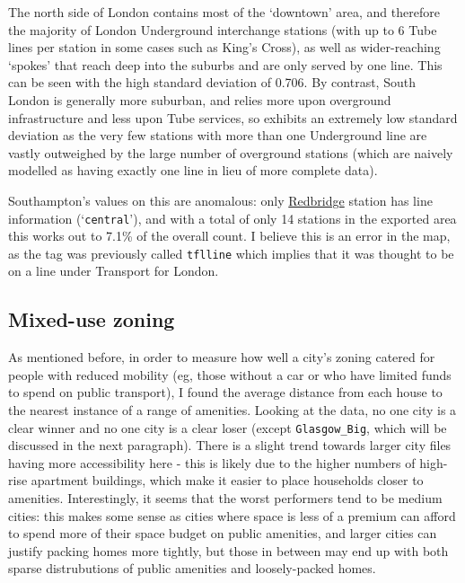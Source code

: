 \documentclass[12pt]{article} %
\begin{document}
The north side of London contains most of the `downtown' area, and therefore the majority of London Underground interchange stations (with up to 6 Tube lines per station in some cases such as King's Cross), as well as wider-reaching `spokes' that reach deep into the suburbs and are only served by one line. This can be seen with the high standard deviation of 0.706. By contrast, South London is generally more suburban, and relies more upon overground infrastructure and less upon Tube services, so exhibits an extremely low standard deviation as the very few stations with more than one Underground line are vastly outweighed by the large number of overground stations (which are naively modelled as having exactly one line in lieu of more complete data).

Southampton's values on this are anomalous: only \href{https://www.openstreetmap.org/node/7170492253}{Redbridge} station has line information (`\texttt{central}'), and with a total of only 14 stations in the exported area this works out to 7.1\% of the overall count. I believe this is an error in the map, as the tag was previously called \texttt{tflline} which implies that it was thought to be on a line under Transport for London.

\subsection{Mixed-use zoning}
As mentioned before, in order to measure how well a city's zoning catered for people with reduced mobility (eg, those without a car or who have limited funds to spend on public transport), I found the average distance from each house to the nearest instance of a range of amenities. Looking at the data, no one city is a clear winner and no one city is a clear loser (except \texttt{Glasgow\_Big}, which will be discussed in the next paragraph). There is a slight trend towards larger city files having more accessibility here - this is likely due to the higher numbers of high-rise apartment buildings, which make it easier to place households closer to amenities. Interestingly, it seems that the worst performers tend to be medium cities: this makes some sense as cities where space is less of a premium can afford to spend more of their space budget on public amenities, and larger cities can justify packing homes more tightly, but those in between may end up with both sparse distrubutions of public amenities and loosely-packed homes.
\end{document}
